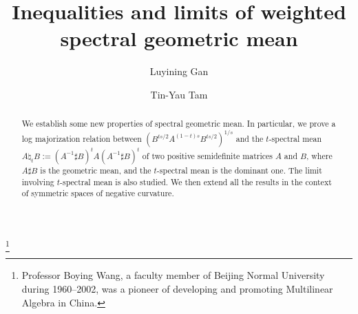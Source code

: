 \documentclass[12pt, reqno]{amsart}
\makeatletter
\renewcommand{\thefootnote}{\fnsymbol{footnote}}
\def\maketitle{\par
      \begingroup
        \def\thefootnote{\fnsymbol{footnote}}%
      \setcounter{footnote}\z@
      \def\@makefnmark{\hbox to\z@{$\m@th^{\@thefnmark}$\hss}}%
      \long\def\@makefntext##1{\noindent
          \ifnum\c@footnote>\z@\relax
            \hbox to1.8em{\hss$\m@th^{\@thefnmark}$}##1%
          \else
          \hbox to1.8em{\hfill}%
            \parbox{\dimexpr\linewidth-1.8em}{\raggedright ##1}%
          \fi}
      \if@twocolumn\twocolumn[\@maketitle]%
      \else\newpage\global\@topnum\z@\@maketitle\fi
      \thispagestyle{titlepage}\@thanks\endgroup
      \setcounter{footnote}\z@
      \gdef\@date{\today}\gdef\@thanks{}%
      \gdef\@author{}\gdef\@title{}\gdef\@dedicatory{}}
\numberwithin{equation}{section}
\theoremstyle{definition}
\makeatother
\begin{document}



\title[Inequalities and limits of weighted Spectral geometric mean]{Inequalities and limits of weighted spectral geometric mean}

\author{Luyining Gan}
\address{Department of Mathematics and Statistics\\ University of Nevada, Reno\\ Reno \\ NV 89557-0084\\ USA}

\author{Tin-Yau Tam}
\address{Department of Mathematics and Statistics\\ University of Nevada, Reno\\ Reno \\ NV 89557-0084\\ USA}

\thanks{Professor Boying Wang, a faculty member of Beijing Normal University during 1960--2002, was a pioneer of developing and promoting Multilinear Algebra in China.}

%



\begin{abstract}
We establish some new properties of spectral geometric mean.
In particular, we prove a log majorization relation between $\left(B^{ts/2}A^{(1-t)s}B^{ts/2} \right)^{1/s}$ and the $t$-spectral mean $A\natural_t B :=(A^{-1}\sharp B)^{t}A(A^{-1}\sharp B)^{t}$ of two positive semidefinite matrices $A$ and $B$, where $A\sharp B$ is the geometric mean, and the $t$-spectral mean is the dominant one. The limit involving $t$-spectral mean is also studied. 
We then extend all the results in the context of symmetric spaces of negative curvature.
\end{abstract}


\maketitle
\end{document}
